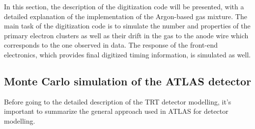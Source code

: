 In this section, the description of the digitization code will be presented, with a detailed explanation of the implementation of the Argon-based gas mixture.
The main task of the digitization code is to simulate the number and properties of the primary electron clusters as well as their drift in the gas to the anode wire which corresponds to the one observed in data. 
The response of the front-end electronics, which provides final digitized timing information, is simulated as well. 

\subsection{Monte Carlo simulation of the ATLAS detector}

Before going to the detailed description of the TRT detector modelling, it's important to summarize the
general approach used in ATLAS for detector modelling.

